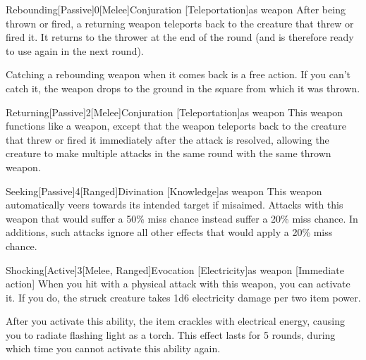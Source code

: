         \begin{magicitemdef}{Rebounding}[Passive]{0}[Melee]{Conjuration [Teleportation]}{as weapon}
             After being thrown or fired, a returning weapon teleports back to the creature that threw or fired it.
            It returns to the thrower at the end of the round (and is therefore ready to use again in the next round).

            Catching a rebounding weapon when it comes back is a free action.
            If you can't catch it, the weapon drops to the ground in the square from which it was thrown.
        \end{magicitemdef}

        \begin{magicitemdef}{Returning}[Passive]{2}[Melee]{Conjuration [Teleportation]}{as weapon}
             This weapon functions like a  weapon, except that the weapon teleports back to the creature that threw or fired it immediately after the attack is resolved, allowing the creature to make multiple attacks in the same round with the same thrown weapon.
        \end{magicitemdef}

        \begin{magicitemdef}{Seeking}[Passive]{4}[Ranged]{Divination [Knowledge]}{as weapon}
             This weapon automatically veers towards its intended target if misaimed.
            Attacks with this weapon that would suffer a 50\% miss chance instead suffer a 20\% miss chance.
            In additions, such attacks ignore all other effects that would apply a 20\% miss chance.
        \end{magicitemdef}

        \begin{magicitemdef}{Shocking}[Active]{3}[Melee, Ranged]{Evocation [Electricity]}{as weapon}
            [Immediate action] When you hit with a physical attack with this weapon, you can activate it.
            If you do, the struck creature takes 1d6 electricity damage per two item power.

            After you activate this ability, the item crackles with electrical energy, causing you to radiate flashing light as a torch.
            This effect lasts for 5 rounds, during which time you cannot activate this ability again.
        \end{magicitemdef}

